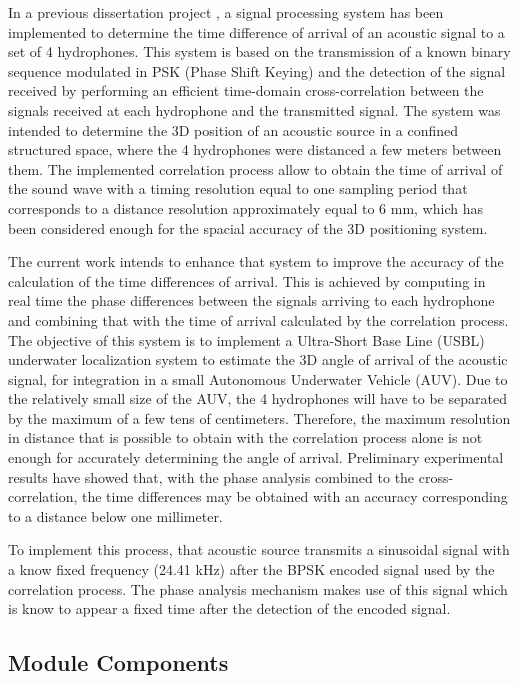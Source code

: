 In a previous dissertation project \cite{afonso-thesis}, a signal processing system has been implemented to determine the time difference of arrival of an acoustic signal to a set of 4 hydrophones. This system is based on the transmission of a known binary sequence modulated in PSK (Phase Shift Keying) and the detection of the signal received by performing an efficient time-domain cross-correlation between the signals received at each hydrophone and the transmitted signal. The system was intended to determine the 3D position of an acoustic source in a confined structured space, where the 4 hydrophones were distanced a few meters between them. The implemented correlation process allow to obtain the time of arrival of the sound wave with a timing resolution equal to one sampling period that corresponds to a distance resolution approximately equal to 6 mm, which has been considered enough for the spacial accuracy of the 3D positioning system.

The current work intends to enhance that system to improve the accuracy of the calculation of the time differences of arrival. This is achieved by computing in real time the phase differences between the signals arriving to each hydrophone and combining that with the time of arrival calculated by the correlation process. The objective of this system is to implement a Ultra-Short Base Line (USBL) underwater localization system to estimate the 3D angle of arrival of the acoustic signal, for integration in a small Autonomous Underwater Vehicle (AUV). Due to the relatively small size of the AUV, the 4 hydrophones will have to be separated by the maximum of a few tens of centimeters. Therefore, the maximum resolution in distance that is possible to obtain with the correlation process alone is not enough for accurately determining the angle of arrival. Preliminary experimental results have showed that, with the phase analysis combined to the cross-correlation, the time differences may be obtained with an accuracy corresponding to a distance below one millimeter. 

To implement this process, that acoustic source transmits a sinusoidal signal with a know fixed frequency (24.41 kHz) after the BPSK encoded signal used by the correlation process. The phase analysis mechanism makes use of this signal which is know to appear a fixed time after the detection of the encoded signal.

\subsection{Module Components}


